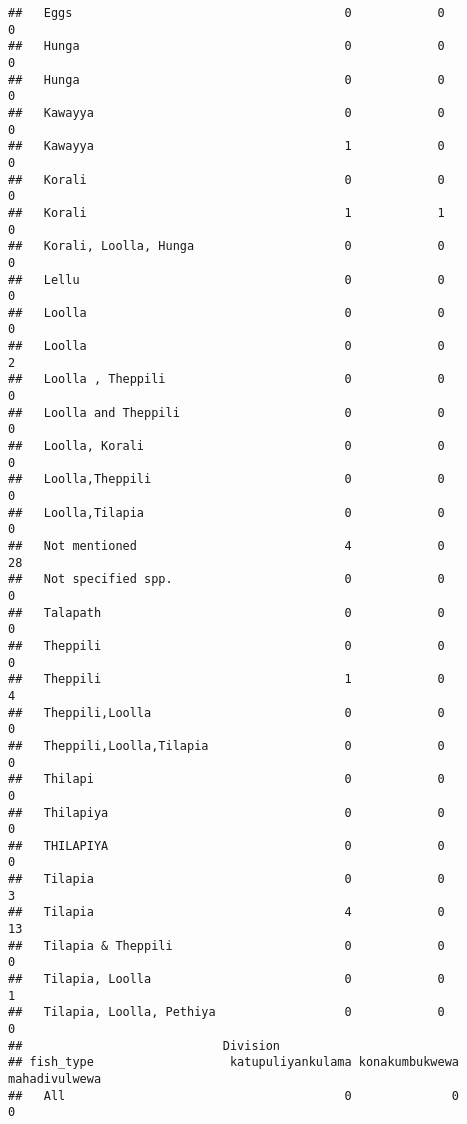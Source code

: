 \documentclass[
]{article}
\begin{document}
\begin{verbatim}
##   Eggs                                      0            0                0
##   Hunga                                     0            0                0
##   Hunga                                     0            0                0
##   Kawayya                                   0            0                0
##   Kawayya                                   1            0                0
##   Korali                                    0            0                0
##   Korali                                    1            1                0
##   Korali, Loolla, Hunga                     0            0                0
##   Lellu                                     0            0                0
##   Loolla                                    0            0                0
##   Loolla                                    0            0                2
##   Loolla , Theppili                         0            0                0
##   Loolla and Theppili                       0            0                0
##   Loolla, Korali                            0            0                0
##   Loolla,Theppili                           0            0                0
##   Loolla,Tilapia                            0            0                0
##   Not mentioned                             4            0               28
##   Not specified spp.                        0            0                0
##   Talapath                                  0            0                0
##   Theppili                                  0            0                0
##   Theppili                                  1            0                4
##   Theppili,Loolla                           0            0                0
##   Theppili,Loolla,Tilapia                   0            0                0
##   Thilapi                                   0            0                0
##   Thilapiya                                 0            0                0
##   THILAPIYA                                 0            0                0
##   Tilapia                                   0            0                3
##   Tilapia                                   4            0               13
##   Tilapia & Theppili                        0            0                0
##   Tilapia, Loolla                           0            0                1
##   Tilapia, Loolla, Pethiya                  0            0                0
##                            Division
## fish_type                   katupuliyankulama konakumbukwewa mahadivulwewa
##   All                                       0              0             0

\end{verbatim}
\end{document}
